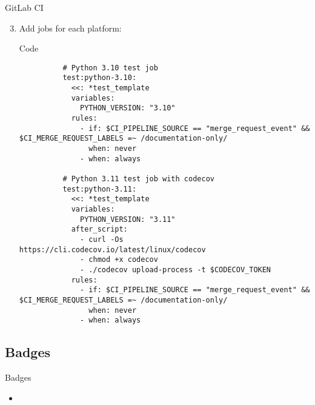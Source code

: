 \begin{frame}[fragile]{GitLab CI}
  \begin{enumerate}
    \setcounter{enumi}{2}
    \item Add jobs for each platform:
      \begin{block}{Code}
        \footnotesize
        \begin{verbatim}
          # Python 3.10 test job
          test:python-3.10:
            <<: *test_template
            variables:
              PYTHON_VERSION: "3.10"
            rules:
              - if: $CI_PIPELINE_SOURCE == "merge_request_event" && $CI_MERGE_REQUEST_LABELS =~ /documentation-only/
                when: never
              - when: always

          # Python 3.11 test job with codecov
          test:python-3.11:
            <<: *test_template
            variables:
              PYTHON_VERSION: "3.11"
            after_script:
              - curl -Os https://cli.codecov.io/latest/linux/codecov
              - chmod +x codecov
              - ./codecov upload-process -t $CODECOV_TOKEN
            rules:
              - if: $CI_PIPELINE_SOURCE == "merge_request_event" && $CI_MERGE_REQUEST_LABELS =~ /documentation-only/
                when: never
              - when: always
        \end{verbatim}
      \end{block}
  \end{enumerate}
\end{frame}

\subsection{Badges}
\begin{frame}[fragile]{Badges}
  \begin{itemize}
    \item
  \end{itemize}
\end{frame}

